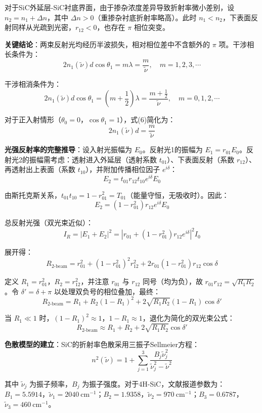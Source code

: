 \documentclass{mcmthesis}
\begin{document}
对于SiC外延层-SiC衬底界面，由于掺杂浓度差异导致折射率微小差别，设 $n_2 = n_1 + \Delta n$，其中 $\Delta n > 0$（重掺杂衬底折射率略高）。此时 $n_1 < n_2$，下表面反射同样从光疏到光密，$r_{12} < 0$，也存在 $\pi$ 相位突变。

\textbf{关键结论}：两束反射光均经历半波损失，相对相位差中不含额外的 $\pi$ 项。干涉相长条件为：
$$2n_1(\tilde{\nu})d\cos\theta_1 = m\lambda = \frac{m}{\tilde{\nu}}, \quad m = 1,2,3,\cdots \tag{6}$$

干涉相消条件为：
$$2n_1(\tilde{\nu})d\cos\theta_1 = \left(m+\frac{1}{2}\right)\lambda = \frac{m+\frac{1}{2}}{\tilde{\nu}}, \quad m = 0,1,2,\cdots \tag{7}$$

对于正入射情形（$\theta_0 = 0$，$\cos\theta_1 = 1$），式(6)简化为：
$$2n_1(\tilde{\nu})d = \frac{m}{\tilde{\nu}} \tag{8}$$

\textbf{光强反射率的完整推导}：设入射光振幅为 $E_0$。反射光1的振幅为 $E_1 = r_{01}E_0$。反射光2的振幅需考虑：透射进入外延层（透射系数 $t_{01}$）、下表面反射（系数 $r_{12}$）、再透射出上表面（系数 $t_{10}$），并附加传播相位因子 $e^{i\delta}$：
$$E_2 = t_{01}r_{12}t_{10}e^{i\delta}E_0 \tag{9}$$

由斯托克斯关系，$t_{01}t_{10} = 1 - r_{01}^2 = T_{01}$（能量守恒，无吸收时）。因此：
$$E_2 = (1-r_{01}^2)r_{12}e^{i\delta}E_0 \tag{10}$$

总反射光强（双光束近似）：
$$I_R = |E_1 + E_2|^2 = |r_{01} + (1-r_{01}^2)r_{12}e^{i\delta}|^2 I_0 \tag{11}$$

展开得：
$$R_{\text{2-beam}} = r_{01}^2 + (1-r_{01}^2)^2r_{12}^2 + 2r_{01}(1-r_{01}^2)r_{12}\cos\delta \tag{12}$$

定义 $R_1 = r_{01}^2$，$R_2 = r_{12}^2$，并注意 $r_{01}$ 与 $r_{12}$ 同号（均为负），故 $r_{01}r_{12} = \sqrt{R_1R_2}$。令 $\delta' = \delta + \pi$ 以处理双负号的相位叠加，最终：
$$R_{\text{2-beam}} = R_1 + R_2(1-R_1)^2 + 2\sqrt{R_1R_2}(1-R_1)\cos\delta' \tag{13}$$

当 $R_1 \ll 1$ 时，$(1-R_1)^2 \approx 1$，$1-R_1 \approx 1$，退化为简化的双光束公式：
$$R_{\text{2-beam}} \approx R_1 + R_2 + 2\sqrt{R_1R_2}\cos\delta' \tag{14}$$

\textbf{色散模型的建立}：SiC的折射率色散采用三振子Sellmeier方程：
$$n^2(\tilde{\nu}) = 1 + \sum_{j=1}^{3}\frac{B_j\tilde{\nu}_j^2}{\tilde{\nu}_j^2 - \tilde{\nu}^2} \tag{15}$$

其中 $\tilde{\nu}_j$ 为振子频率，$B_j$ 为振子强度。对于4H-SiC，文献报道参数为：$B_1 = 5.5914$，$\tilde{\nu}_1 = 2040\ \text{cm}^{-1}$；$B_2 = 1.9358$，$\tilde{\nu}_2 = 970\ \text{cm}^{-1}$；$B_3 = 0.6787$，$\tilde{\nu}_3 = 460\ \text{cm}^{-1}$。
\end{document}
